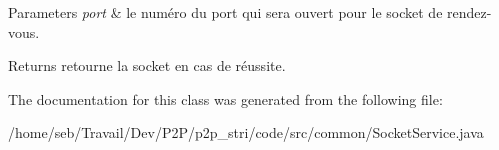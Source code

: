 \begin{DoxyParams}{Parameters}
{\em port} & le numéro du port qui sera ouvert pour le socket de rendez-\/vous. \\
\hline
\end{DoxyParams}
\begin{DoxyReturn}{Returns}
retourne la socket en cas de réussite. 
\end{DoxyReturn}


The documentation for this class was generated from the following file\+:\begin{DoxyCompactItemize}
\item 
/home/seb/\+Travail/\+Dev/\+P2\+P/p2p\+\_\+stri/code/src/common/Socket\+Service.\+java\end{DoxyCompactItemize}
